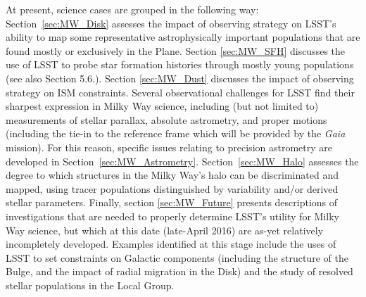 At present, science cases are grouped in the following way:
Section~\ref{sec:MW_Disk} assesses the impact of
observing strategy on LSST's ability to map some representative
astrophysically important populations that are found mostly or
exclusively in the Plane.  Section \ref{sec:MW_SFH} discusses the
  use of LSST to probe star formation histories through mostly young
  populations (see also Section 5.6.). Section \ref{sec:MW_Dust} discusses
  the impact of observing strategy on ISM constraints.
  Several observational challenges for LSST find their
sharpest expression in Milky Way science, including (but not limited
to) measurements of stellar parallax, absolute astrometry, and proper
motions (including the tie-in to the reference frame which will be
provided by the \textit{Gaia} mission). For this reason, specific
issues relating to precision astrometry are developed in
Section~\ref{sec:MW_Astrometry}.
Section~\ref{sec:MW_Halo} assesses the degree to which structures in
the Milky Way's halo can be discriminated and mapped, using tracer
populations distinguished by variability and/or derived stellar
parameters. Finally, section \ref{sec:MW_Future} presents descriptions of investigations
that are needed to properly determine LSST's utility for Milky Way
science, but which at this date (late-April 2016) are as-yet relatively
incompletely developed. Examples identified at this stage include the
uses of LSST to set constraints on Galactic components 
(including the structure of the Bulge, and the impact of radial migration in the Disk)
and the study of resolved stellar populations in the Local Group.

%

%






%
%

